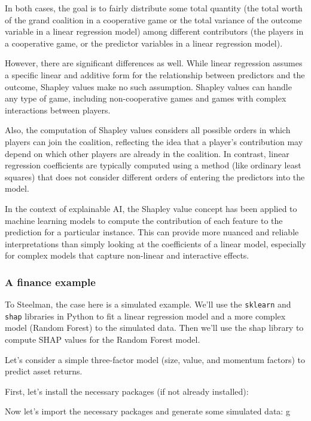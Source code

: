\documentclass[
  letterpaper,
  DIV=11,
  numbers=noendperiod]{scrartcl}
\begin{document}
In both cases, the goal is to fairly distribute some total quantity (the
total worth of the grand coalition in a cooperative game or the total
variance of the outcome variable in a linear regression model) among
different contributors (the players in a cooperative game, or the
predictor variables in a linear regression model).

However, there are significant differences as well. While linear
regression assumes a specific linear and additive form for the
relationship between predictors and the outcome, Shapley values make no
such assumption. Shapley values can handle any type of game, including
non-cooperative games and games with complex interactions between
players.

Also, the computation of Shapley values considers all possible orders in
which players can join the coalition, reflecting the idea that a
player's contribution may depend on which other players are already in
the coalition. In contrast, linear regression coefficients are typically
computed using a method (like ordinary least squares) that does not
consider different orders of entering the predictors into the model.

In the context of explainable AI, the Shapley value concept has been
applied to machine learning models to compute the contribution of each
feature to the prediction for a particular instance. This can provide
more nuanced and reliable interpretations than simply looking at the
coefficients of a linear model, especially for complex models that
capture non-linear and interactive effects.

\hypertarget{a-finance-example}{%
\subsubsection{A finance example}\label{a-finance-example}}

To Steelman, the case here is a simulated example. We'll use the
\texttt{sklearn} and \texttt{shap} libraries in Python to fit a linear
regression model and a more complex model (Random Forest) to the
simulated data. Then we'll use the shap library to compute SHAP values
for the Random Forest model.

Let's consider a simple three-factor model (size, value, and momentum
factors) to predict asset returns.

First, let's install the necessary packages (if not already installed):

Now let's import the necessary packages and generate some simulated
data: g
\end{document}
